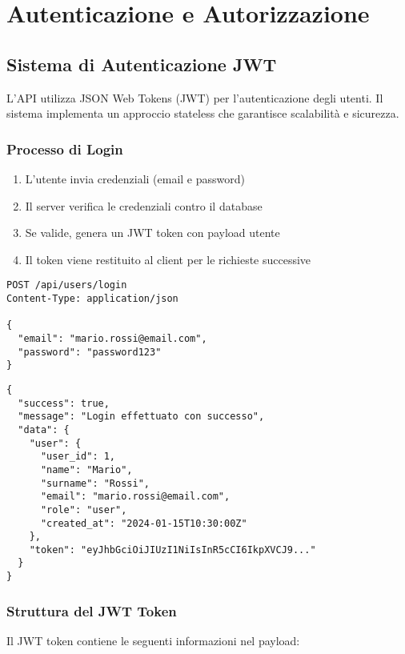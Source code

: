 \section{Autenticazione e Autorizzazione}

\subsection{Sistema di Autenticazione JWT}
L'API utilizza JSON Web Tokens (JWT) per l'autenticazione degli utenti. Il sistema implementa un approccio stateless che garantisce scalabilità e sicurezza.

\subsubsection{Processo di Login}
\begin{enumerate}
    \item L'utente invia credenziali (email e password)
    \item Il server verifica le credenziali contro il database
    \item Se valide, genera un JWT token con payload utente
    \item Il token viene restituito al client per le richieste successive
\end{enumerate}

\begin{lstlisting}[style=httpstyle, caption=Richiesta di Login]
POST /api/users/login
Content-Type: application/json

{
  "email": "mario.rossi@email.com",
  "password": "password123"
}
\end{lstlisting}

\newpage

\begin{lstlisting}[caption=Risposta Login Successful]
{
  "success": true,
  "message": "Login effettuato con successo",
  "data": {
    "user": {
      "user_id": 1,
      "name": "Mario",
      "surname": "Rossi", 
      "email": "mario.rossi@email.com",
      "role": "user",
      "created_at": "2024-01-15T10:30:00Z"
    },
    "token": "eyJhbGciOiJIUzI1NiIsInR5cCI6IkpXVCJ9..."
  }
}
\end{lstlisting}

\subsubsection{Struttura del JWT Token}
Il JWT token contiene le seguenti informazioni nel payload:

